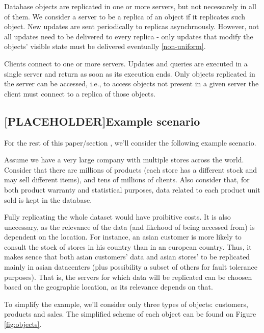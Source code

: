 \documentclass{vldb}
\begin{document}
Database objects are replicated in one or more servers, but not necessarely in all of them.  We consider a server to be a replica of an object if it replicates such object. New updates are sent periodically to replicas asynchrnously. However, not all updates need to be delivered to every replica - only updates that modify the objects' visible state must be delivered eventually \ref{non-uniform}. %


Clients connect to one or more servers. Updates and queries are executed in a single server and return as soon as its execution ends. Only objects replicated in the server can be accessed, i.e., to access objects not present in a given server the client must connect to a replica of those objects.

\subsection{[PLACEHOLDER]Example scenario}
\label{subsec:example}

For the rest of this paper/section %
, we'll consider the following example scenario.

Assume we have a very large company with multiple stores across the world.
Consider that there are millions of products (each store has a different stock and may sell different items), and tens of millions of clients.
Also consider that, for both product warranty and statistical purposes, data related to each product unit sold is kept in the database.

Fully replicating the whole dataset would have proibitive costs.
It is also unecessary, as the relevance of the data (and likehood of being accessed from) is dependent on the location.
For instance, an asian customer is more likely to consult the stock of stores in his country than in an european country.
Thus, it makes sence that both asian customers' data and asian stores' to be replicated mainly in asian datacenters (plus possibility a subset of others for fault tolerance purposes).
That is, the servers for which data will be replicated can be choosen based on the geographic location, as its relevance depends on that.

To simplify the example, we'll consider only three types of objects: customers, products and sales.
The simplified scheme of each object can be found on Figure \ref{fig:objects}.\\
\end{document}
